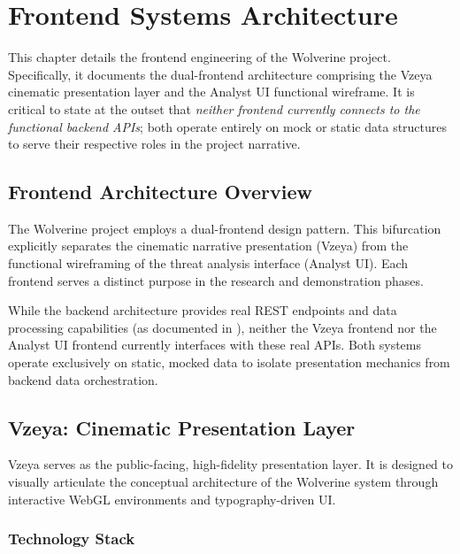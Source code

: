 \chapter{Frontend Systems Architecture}
\label{ch:frontend-systems}

This chapter details the frontend engineering of the Wolverine project. Specifically, it documents the dual-frontend architecture comprising the Vzeya cinematic presentation layer and the Analyst UI functional wireframe. It is critical to state at the outset that \textit{neither frontend currently connects to the functional backend APIs}; both operate entirely on mock or static data structures to serve their respective roles in the project narrative.

\section{Frontend Architecture Overview}
\label{sec:fe-overview}

The Wolverine project employs a dual-frontend design pattern. This bifurcation explicitly separates the cinematic narrative presentation (Vzeya) from the functional wireframing of the threat analysis interface (Analyst UI). Each frontend serves a distinct purpose in the research and demonstration phases.

While the backend architecture provides real REST endpoints and data processing capabilities (as documented in ), neither the Vzeya frontend nor the Analyst UI frontend currently interfaces with these real APIs. Both systems operate exclusively on static, mocked data to isolate presentation mechanics from backend data orchestration.

\section{Vzeya: Cinematic Presentation Layer}
\label{sec:fe-vzeya}

Vzeya serves as the public-facing, high-fidelity presentation layer. It is designed to visually articulate the conceptual architecture of the Wolverine system through interactive WebGL environments and typography-driven UI.

\subsection{Technology Stack}
\label{sec:fe-vzeya-stack}

